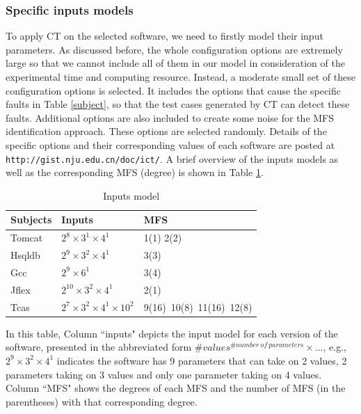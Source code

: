 \documentclass[10pt,journal,compsoc]{IEEEtran}
\begin{document}
\subsubsection{Specific inputs models}
To apply CT on the selected software, we need to firstly model their input parameters. As discussed before, the whole configuration options are extremely large so that we cannot include all of them in our model in consideration of the experimental time and computing resource. Instead, a moderate small set of these configuration options is selected.  It includes the options that cause the specific faults in Table \ref{subject}, so that the test cases generated by CT can detect these faults. Additional options are also included to create some noise for the MFS identification approach. These options are selected randomly. Details of the specific options and their corresponding values of each software are posted at \texttt{http://gist.nju.edu.cn/doc/ict/}.  A brief overview of the inputs models as well as the corresponding MFS (degree) is shown in Table \ref{inputs}.


\begin{table}[ht]
\caption{Inputs model }
\label{inputs}
\centering
\begin{tabular}{l|l|l}
\hline
Subjects & Inputs & MFS \\
\hline
Tomcat   &  $2^{8} \times 3^{1} \times 4^{1}$       & 1(1) 2(2)  \\
Hsqldb   &   $2^{9} \times 3^{2} \times 4^{1}$      &  3(3) \\
Gcc      &   $2^{9} \times 6^{1}$      &    3(4)  \\
Jflex    & $2^{10} \times 3^{2} \times 4^{1} $        &   2(1)   \\
Tcas     &  $2^{7} \times 3^{2} \times 4^{1} \times 10^{2} $ &9(16)\ 10(8)\ 11(16)\ 12(8) \\ \hline
\end{tabular}

\end{table}
In this table, Column ``inputs" depicts the input model for each version of the software, presented in the abbreviated form $\#values^{\#number\ of\ parameters} \times ...$, e.g., $2^{9} \times 3^{2} \times 4^{1}$ indicates the software has 9 parameters that can take on 2 values, 2 parameters taking on 3 values and only one parameter taking on 4 values. Column ``MFS" shows the degrees of each MFS and the number of MFS (in the parentheses) with that corresponding degree.
\end{document}
